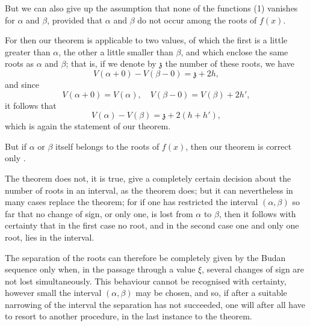 
But we can also give up the assumption that none of the functions (1)
vanishes for $\alpha$ and $\beta$, provided that $\alpha$ and $\beta$ do
not occur among the roots of $f(x)$.

For then our theorem is applicable to two values, of which the first is a
little greater than $\alpha$, the other a little smaller than $\beta$, and
which enclose the same roots as $\alpha$ and $\beta$; that is, if we
denote by $\mathfrak{z}$ the number of these roots, we have
\[
V(\alpha + 0) - V(\beta - 0) = \mathfrak{z} + 2h,
\]
and since
\[
V(\alpha + 0) = V(\alpha), \quad V(\beta - 0) = V(\beta) + 2h',
\]
it follows that
\[
V(\alpha) - V(\beta) = \mathfrak{z} + 2(h + h'),
\]
which is again the statement of our theorem.

But if $\alpha$ or $\beta$ itself belongs to the roots of $f(x)$, then our
theorem is correct only .

The  theorem does not, it is true, give a
completely certain decision about the number of roots in an interval, as
the  theorem does; but it can nevertheless in many cases
replace the  theorem; for if one has restricted the
interval $(\alpha, \beta)$ so far that no change of sign, or only one, is
lost from $\alpha$ to $\beta$, then it follows with certainty that in the
first case no root, and in the second case one and only one root, lies in
the interval.

The separation of the roots can therefore be completely given by the Budan
sequence only when, in the passage through a value $\xi$, several changes
of sign are not lost simultaneously. This behaviour cannot be recognised
with certainty, however small the interval $(\alpha, \beta)$ may be
chosen, and so, if after a suitable narrowing of the interval the
separation has not succeeded, one will after all have to resort to another
procedure, in the last instance to the  theorem.
